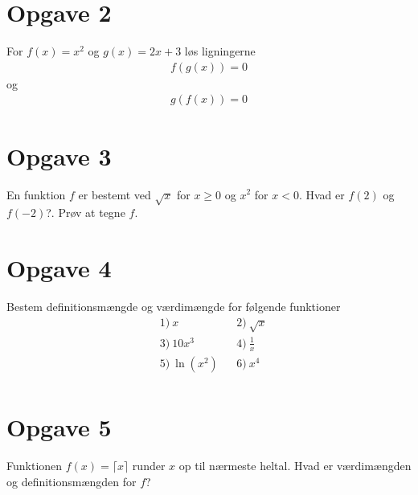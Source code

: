 \section*{Opgave 2}
For $f(x) = x^2$ og $g(x)=2x+3$ løs ligningerne
\begin{align*}
f(g(x)) = 0
\end{align*}
og 
\begin{align*}
g(f(x))=0
\end{align*}
\section*{Opgave 3}
En funktion $f$ er bestemt ved $\sqrt{x}$ for $x\geq 0$ og $x^2$ for $x<0$. Hvad er $f(2)$ og $f(-2)$?. Prøv at tegne $f$. 
\section*{Opgave 4}
Bestem definitionsmængde og værdimængde for følgende funktioner
\begin{align*}
&1) \ x  &&2) \ \sqrt{x}  \\
&3) \ 10x^3  &&4) \ \frac{1}{x}  \\
&5) \  \ln(x^2) &&6) \ x^4   \\
\end{align*}
\section*{Opgave 5}
Funktionen $f(x) = \lceil x \rceil$ runder $x$ op til nærmeste heltal. Hvad er værdimængden og definitionsmængden for $f$?